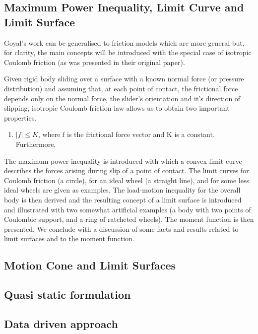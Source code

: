 \documentclass[12,twoside]{TFG-GM}
\theoremstyle{definition}
\theoremstyle{remark}
\begin{document}
\subsection{Maximum Power Inequality, Limit Curve and Limit Surface}
\label{subsec:mpi}
Goyal's work can be generalised to friction models which are more general but, for clarity, the main concepts will be introduced with the special case of isotropic Coulomb friction (as was presented in their original paper).

Given rigid body sliding over a surface with a known normal force (or pressure distribution) and assuming that, at each point of contact, the frictional force depends only on the normal force, the slider's orientation and it's direction of slipping, isotropic Coulomb friction law allows us to obtain two important properties.
\begin{enumerate}
\item $|f| \leq K$, where f is the frictional force vector and K is a constant. Furthermore,
\end{enumerate}

The maximum-power inequality is introduced with which a convex limit curve describes the forces arising during slip of a point of contact. The limit curves for Coulomb friction (a circle), for an ideal wheel (a straight line), and for some less ideal wheels are given as examples. The load-motion inequality for the overall body is then derived and the resulting concept of a limit surface is introduced and illustrated with two somewhat artificial examples (a body with two points of Coulombic support, and a ring of ratcheted wheels). The moment function is then presented. We conclude with a discussion of some facts and results related to limit surfaces and to the moment function.

\subsection{Motion Cone and Limit Surfaces}
\label{subsec:motioncone}

\subsection{Quasi static formulation}
\label{subsec:quasistatic}

\subsection{Data driven approach}
\label{subsec:datadriven} 
\end{document}

